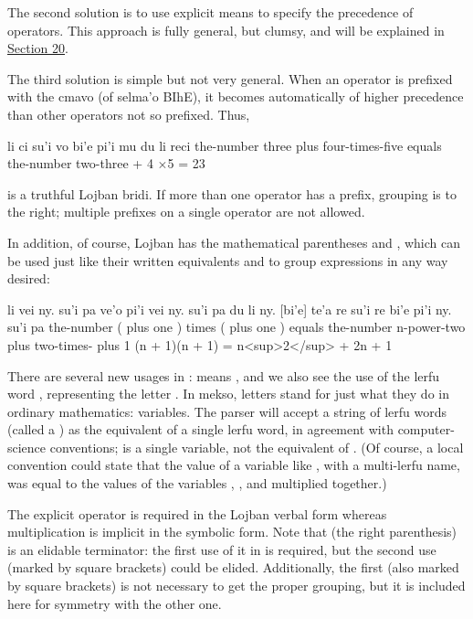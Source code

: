 The second solution is to use explicit means to specify the
    precedence of operators. This approach is fully general, but
    clumsy, and will be explained in \hyperref[sec:18:20]{Section
    20}.

The third solution is simple but not very general. When an
    operator is prefixed with the cmavo  (of selma'o BIhE),
    it becomes automatically of higher precedence than other
    operators not so prefixed. Thus,
\begin{example}
li ci su'i vo bi'e pi'i mu\n
\T	du li reci\n
the-number three plus four-times-five\n
\T	equals the-number two-three + 4 $\times$5 = 23
\end{example}

{\noindent}is a truthful Lojban bridi. If more than one operator has a
     prefix, grouping is to the right; multiple 
    prefixes on a single operator are not allowed. 

In addition, of course, Lojban has the mathematical
    parentheses  and , which can be used just like
    their written equivalents \q{(} and \q{)} to group expressions
    in any way desired:
\begin{example}
li vei ny. su'i pa ve'o pi'i vei ny. su'i pa \n
\T	du li ny. [bi'e] te'a re su'i re bi'e pi'i ny. su'i pa\n
the-number (  plus one ) times (  plus one )\n
\T	equals the-number n-power-two plus two-times- plus 1\n
(n + 1)(n + 1) = n<sup>2</sup> + 2n + 1
\end{example}

There are several new usages in :  means , and we also
    see the use of the lerfu word , representing the letter
    . In mekso, letters stand for just what they do in
    ordinary mathematics: variables. The parser will accept a
    string of lerfu words (called a ) as the
    equivalent of a single lerfu word, in agreement with
    computer-science conventions;  is a single variable, not
    the equivalent of . (Of course, a
    local convention could state that the value of a variable like
    , with a multi-lerfu name, was equal to the values of
    the variables , , and  multiplied together.) 

The explicit operator  is required in the Lojban
    verbal form whereas multiplication is implicit in the symbolic
    form. Note that  (the right parenthesis) is an elidable
    terminator: the first use of it in  is required, but the second use (marked by square
    brackets) could be elided. Additionally, the first 
    (also marked by square brackets) is not necessary to get the
    proper grouping, but it is included here for symmetry with the
    other one.



